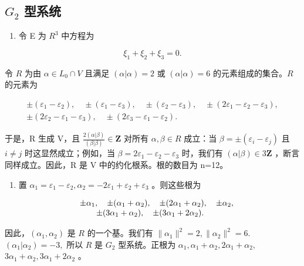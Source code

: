\subsection{\texorpdfstring{\(G_{2}\) 型系统}{G\_2 型系统}}

\begin{enumerate}
\def\labelenumi{(\Roman{enumi})}
\tightlist
\item
  令 E 为 \(R^{3}\) 中方程为
\end{enumerate}

\[
\xi_ {1} + \xi_ {2} + \xi_ {3} = 0.
\]

  令 \(R\) 为由 \(\alpha \in L_0 \cap V\) 且满足 \((\alpha | \alpha) = 2\) 或 \((\alpha | \alpha) = 6\) 的元素组成的集合。\(R\) 的元素为

\[
\begin{array}{c} \pm (\varepsilon_ {1} - \varepsilon_ {2}), \quad \pm (\varepsilon_ {1} - \varepsilon_ {3}), \quad \pm (\varepsilon_ {2} - \varepsilon_ {3}), \quad \pm (2 \varepsilon_ {1} - \varepsilon_ {2} - \varepsilon_ {3}), \\ \pm (2 \varepsilon_ {2} - \varepsilon_ {1} - \varepsilon_ {3}), \quad \pm (2 \varepsilon_ {3} - \varepsilon_ {1} - \varepsilon_ {2}). \end{array}
\]

  于是，R 生成 V，且 \(\frac{2(\alpha|\beta)}{(\beta|\beta)}\in\mathbf{Z}\) 对所有 \(\alpha,\beta\in R\) 成立：当 \(\beta=\pm(\varepsilon_{i}-\varepsilon_{j})\) 且 \(i\neq j\) 时这显然成立；例如，当 \(\beta=2\varepsilon_{1}-\varepsilon_{2}-\varepsilon_{3}\) 时，我们有 \((\alpha|\beta)\in3\mathbf{Z}\) ，断言同样成立。因此，R 是 V 中的约化根系。根的数目为 n=12。

\begin{enumerate}
\def\labelenumi{(\Roman{enumi})}
\setcounter{enumi}{1}
\tightlist
\item
  置 \(\alpha_{1} = \varepsilon_{1} - \varepsilon_{2},\alpha_{2} = -2\varepsilon_{1} + \varepsilon_{2} + \varepsilon_{3}\) 。则这些根为
\end{enumerate}

\[
\begin{array}{r l} & {\pm \alpha_ {1}, \quad \pm (\alpha_ {1} + \alpha_ {2}), \quad \pm (2 \alpha_ {1} + \alpha_ {2}), \quad \pm \alpha_ {2},} \\ & {\qquad \pm (3 \alpha_ {1} + \alpha_ {2}), \quad \pm (3 \alpha_ {1} + 2 \alpha_ {2}).} \end{array}
\]

因此，\((\alpha_{1},\alpha_{2})\) 是 \(R\) 的一个基。我们有 \(\| \alpha_{1}\|^{2} = 2,\| \alpha_{2}\|^{2} = 6.\) \((\alpha_{1}|\alpha_{2}) = -3,\) 所以 \(R\) 是 \(G_{2}\) 型系统。正根为 \(\alpha_{1},\alpha_{1} + \alpha_{2},2\alpha_{1} + \alpha_{2},\) \(3\alpha_{1} + \alpha_{2},3\alpha_{1} + 2\alpha_{2}\) 。

